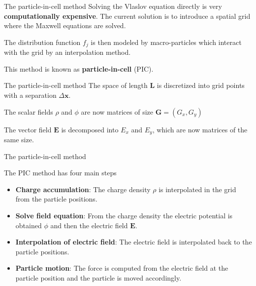 \documentclass{beamer}
\newcommand*\V[1]{\bm{#1}}
\newcommand{\E}{\V{E}}
\newcommand{\x}{\V{x}}
\begin{document}
\begin{frame}{The particle-in-cell method}{}
Solving the Vlaslov equation directly is very \textbf{computationally 
expensive}. The current solution is to introduce a spatial grid where the 
Maxwell equations are solved.

\vspace{1em}
The distribution function $f_j$ is then modeled by macro-particles which 
interact with the grid by an interpolation method.

\vspace{1em}
This method is known as \textbf{particle-in-cell} (PIC).
\end{frame}

\begin{frame}{The particle-in-cell method}{}
The space of length $\V L$ is discretized into grid points with a separation 
$\Delta \x$.

\vspace{1em}
The scalar fields $\rho$ and $\phi$ are now matrices of size $\V G = (G_x, G_y)$

\vspace{1em}
The vector field $\E$ is decomposed into $E_x$ and $E_y$, which are now matrices 
of the same size.

\end{frame}

\begin{frame}{The particle-in-cell method}{}

The PIC method has four main steps

\begin{itemize}
\setlength\itemsep{1em}
\item \textbf{Charge accumulation}: The charge density $\rho$ is interpolated in 
the grid from the particle positions.
\pause
\item \textbf{Solve field equation}: From the charge density the electric 
potential is obtained $\phi$ and then the electric field $\E$.
\pause
\item \textbf{Interpolation of electric field}: The electric field is  
interpolated back to the particle positions.
\pause
\item \textbf{Particle motion}: The force is computed from the electric field at 
the particle position and the particle is moved accordingly.
\end{itemize}
\end{frame}
\end{document}
